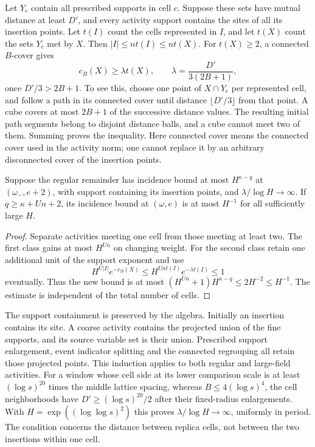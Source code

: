 Let $Y_c$ contain all prescribed supports in cell $c$. Suppose
these sets have mutual distance at least $D'$, and every activity
support contains the sites of all its insertion points. Let $t(I)$ count
the cells represented in $I$, and let $t(X)$ count the sets $Y_c$
met by $X$. Then $|I|\le nt(I)\le nt(X)$.
For $t(X)\ge2$, a connected $B$-cover gives
\begin{equation}\label{ch11:dispersal}
 c_B(X)\ge\lambda t(X),\qquad
 \lambda=\frac{D'}{3(2B+1)},
\end{equation}
once $D'/3>2B+1$.
To see this, choose one point of $X\cap Y_c$ per represented cell,
and follow a path in its connected cover until distance
$\lfloor D'/3\rfloor$ from that point. A cube covers at most
$2B+1$ of the successive distance values. The resulting initial
path segments belong to disjoint distance balls, and a cube
cannot meet two of them. Summing proves the inequality.
Here connected cover means the connected cover used in the
activity norm; one cannot replace it by an arbitrary disconnected
cover of the insertion points.

\begin{lemma}\label{ch11:restore-regular}
Suppose the regular remainder has incidence bound at most
$H^{\kappa-q}$ at $(\omega_-,e+2)$, with support containing its
insertion points, and $\lambda/\log H\to\infty$.
If $q\ge\kappa+Un+2$, its incidence bound at $(\omega,e)$ is at most
$H^{-1}$ for all sufficiently large $H$.
\end{lemma}
\begin{proof}
Separate activities meeting one cell from those meeting at least
two. The first class gains at most $H^{Un}$ on changing weight.
For the second class retain one additional unit of the support exponent and use
\[
 H^{U|I|}e^{-c_B(X)}
 \le H^{Unt(I)}e^{-\lambda t(I)}\le1
\]
eventually. Thus the new bound is at most
$(H^{Un}+1)H^{\kappa-q}\le2H^{-2}\le H^{-1}$.
The estimate is independent of the total number of cells.
\end{proof}

The support containment is preserved by the algebra.
Initially an insertion contains its site. A coarse activity
contains the projected union of the fine supports, and its source variable
set is their union. Prescribed support enlargement, event indicator splitting
and the connected regrouping all retain those projected points.
This induction applies to both regular and large-field activities.
For a window whose cell side at its lower comparison scale is at least
$(\log s)^{20}$ times the middle lattice spacing, whereas
$B\le4(\log s)^4$, the cell neighborhoods have
$D'\ge(\log s)^{20}/2$ after their fixed-radius enlargements.
With $H=\exp((\log\log s)^2)$ this proves
$\lambda/\log H\to\infty$, uniformly in period.
The condition concerns the distance between replica cells, not
between the two insertions within one cell.

